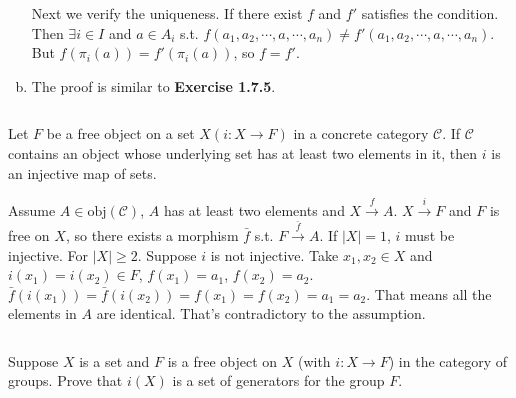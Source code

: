 \begin{answer}
\begin{enumerate}[(a)]
        Next we verify the uniqueness. If there exist $f$ and $f'$ satisfies the condition. Then $\exists i\in I$ and $a\in A_{i}$ s.t. $f(a_{1},a_{2},\cdots,a,\cdots,a_{n})\neq f'(a_{1},a_{2},\cdots,a,\cdots,a_{n})$. But $f(\pi_{i}(a))=f'(\pi_{i}(a))$, so $f=f'$.
        \item The proof is similar to \textbf{Exercise 1.7.5}.
    \end{enumerate}
\end{answer}

$$ $$

\begin{ex}
    Let $F$ be a free object on a set $X(i:X\to F)$ in a concrete category $\mathcal{C}$. If $\mathcal{C}$ contains an object whose underlying set has at least two elements in it, then $i$ is an injective map of sets.
\end{ex}

\begin{answer}
    Assume $A\in\mathrm{obj}(\mathcal{C})$, $A$ has at least two elements and $X\xrightarrow{f} A$. $X\xrightarrow{i} F$ and $F$ is free on $X$, so there exists a morphism $\bar{f}$ s.t. $F\xrightarrow{\bar{f}}A$. If $\left| X \right|=1$, $i$ must be injective. For $\left| X \right| \geq 2$. Suppose $i$ is not injective. Take $x_{1}, x_{2}\in X$ and $i(x_{1})=i(x_{2})\in F$, $f(x_{1})=a_{1}$, $f(x_{2})=a_{2}$. $\bar{f}(i(x_{1}))=\bar{f}(i(x_{2}))=f(x_{1})=f(x_{2})=a_{1}=a_{2}$. That means all the elements in $A$ are identical. That's contradictory to the assumption.
\end{answer}

$$ $$

\begin{ex}
    Suppose $X$ is a set and $F$ is a free object on $X$ (with $i:X\to F$) in the category of groups. Prove that $i(X)$ is a set of generators for the group $F$.
\end{ex}

